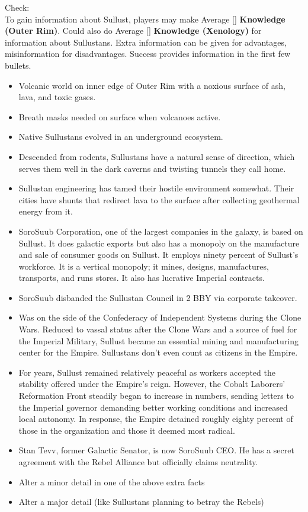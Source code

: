 \documentclass{book}
\newcommand{\df}{\difficulty}
\begin{document}
\begin{multicols}{2}
Check:\\
    To gain information about Sullust, players may make Average [\df\df] \textbf{Knowledge (Outer Rim)}. Could also do Average [\df\df] \textbf{Knowledge (Xenology)} for information about Sullustans. Extra information can be given for advantages, misinformation for disadvantages. Success provides information in the first few bullets.\\
\begin{itemize}
    \item Volcanic world on inner edge of Outer Rim with a noxious surface of ash, lava, and toxic gases.  
    \item Breath masks needed on surface when volcanoes active.
    \item Native Sullustans evolved in an underground ecosystem.
    \item \advantage Descended from rodents, Sullustans have a natural sense of direction, which serves them well in the dark caverns and twisting tunnels they call home.
    \item \advantage  Sullustan engineering has tamed their hostile environment somewhat. Their cities have shunts that redirect lava to the surface after collecting geothermal energy from it.
   \item \advantage SoroSuub Corporation, one of the largest companies in the galaxy, is based on Sullust. It does galactic exports but also has a monopoly on the manufacture and sale of consumer goods on Sullust. It employs ninety percent of Sullust’s workforce. It is a vertical monopoly; it mines, designs, manufactures, transports, and runs stores. It also has lucrative Imperial contracts.
	\item \advantage SoroSuub disbanded the Sullustan Council in 2 BBY via corporate takeover.
    \item \advantage Was on the side of the Confederacy of Independent Systems during the Clone Wars. Reduced to vassal status after the Clone Wars and a source of fuel for the Imperial Military, Sullust became an essential mining and manufacturing center for the Empire. Sullustans don’t even count as citizens in the Empire.
    \item \advantage For years, Sullust remained relatively peaceful as workers accepted the stability offered under the Empire's reign. However, the Cobalt Laborers' Reformation Front steadily began to increase in numbers, sending letters to the Imperial governor demanding better working conditions and increased local autonomy. In response, the Empire detained roughly eighty percent of those in the organization and those it deemed most radical.
    \item \triumph Stan Tevv, former Galactic Senator, is now SoroSuub CEO.  He has a secret agreement with the Rebel Alliance but officially claims neutrality.
    \item \threat Alter a minor detail in one of the above extra facts
    \item \despair Alter a major detail (like Sullustans planning to betray the Rebels)
\end{itemize}




\end{multicols}
\end{document}
